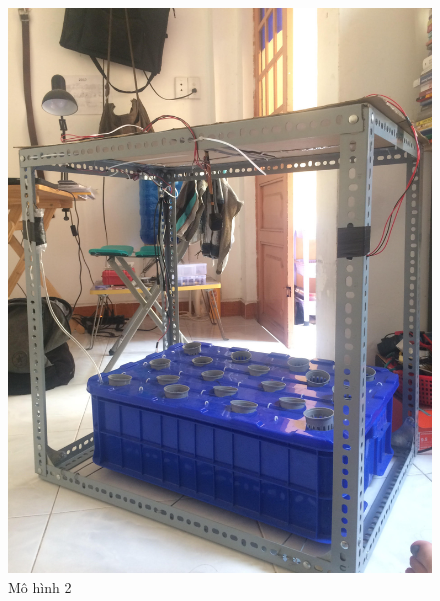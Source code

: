 \documentclass[a4paper,12pt,oneside]{article}
\begin{document}
\begin{enumerate}
			\begin{figure}[H]
			\centering
			\begin{center}
			\includegraphics[scale=.15]{hinh/mohinh_2.jpg}
			\end{center}
			\caption{Mô hình 2}
			\end{figure}
			

\end{enumerate}
\end{document}
